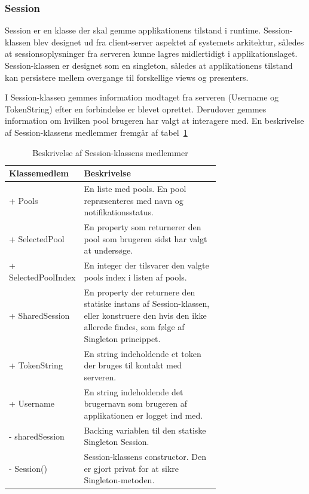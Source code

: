 \subsubsection{Session}

Session er en klasse der skal gemme applikationens tilstand i runtime. Session-klassen blev designet ud fra client-server aspektet af systemets arkitektur, således at sessionsoplysninger fra serveren kunne lagres midlertidigt i applikationslaget. Session-klassen er designet som en singleton, således at applikationens tilstand kan persistere mellem overgange til forskellige views og presenters.

I Session-klassen gemmes information modtaget fra serveren (Username og TokenString) efter en forbindelse er blevet oprettet. Derudover gemmes information om hvilken pool brugeren har valgt at interagere med. En beskrivelse af Session-klassens medlemmer fremgår af tabel~\ref{tab:table_design_session}

\begin{table}
	\centering
	\begin{tabular}{| l | p{0.7\linewidth} |}
		\toprule
		\textbf{Klassemedlem}	& \textbf{Beskrivelse} \\
		\midrule
		+ Pools		& En liste med pools. En pool repræsenteres med navn og notifikationsstatus.		\\\hline
		+ SelectedPool			& En property som returnerer den pool som brugeren sidst har valgt at undersøge.	\\\hline
		+ SelectedPoolIndex				& En integer der tilsvarer den valgte pools index i listen af pools.				\\\hline
		+ SharedSession				& En property der returnere den statiske instans af Session-klassen, eller konstruere den hvis den ikke allerede findes, som følge af Singleton princippet. \\\hline
		+ TokenString					& En string indeholdende et token der bruges til kontakt med serveren. \\\hline
		+ Username						& En string indeholdende det brugernavn som brugeren af applikationen er logget ind med. \\\hline
		- sharedSession					& Backing variablen til den statiske Singleton Session. \\\hline
		- Session()							& Session-klassens constructor. Den er gjort privat for at sikre Singleton-metoden. \\
		\bottomrule
		\end{tabular}
	\caption{Beskrivelse af Session-klassens medlemmer}
	\label{tab:table_design_session}	
\end{table}

